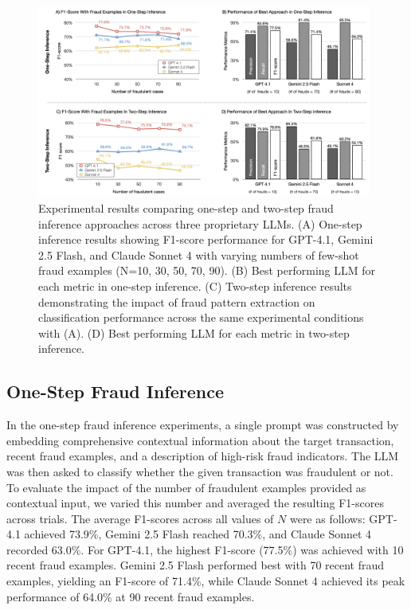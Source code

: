 \documentclass[sigconf]{acmart}
\begin{document}
\begin{figure}[t!]
  \centering
  \includegraphics[width=0.98\textwidth]{./figures/fig_results.png}
  \caption{Experimental results comparing one-step and two-step fraud inference approaches across three proprietary LLMs. (A) One-step inference results showing F1-score performance for GPT-4.1, Gemini 2.5 Flash, and Claude Sonnet 4 with varying numbers of few-shot fraud examples (N=10, 30, 50, 70, 90). (B) Best performing LLM for each metric in one-step inference. (C) Two-step inference results demonstrating the impact of fraud pattern extraction on classification performance across the same experimental conditions with (A). (D) Best performing LLM for each metric in two-step inference.}
  \label{fig_results}
\end{figure}




\subsection{One-Step Fraud Inference}
In the one-step fraud inference experiments, a single prompt was constructed by embedding comprehensive contextual information about the target transaction, recent fraud examples, and a description of high-risk fraud indicators. The LLM was then asked to classify whether the given transaction was fraudulent or not. To evaluate the impact of the number of fraudulent examples provided as contextual input, we varied this number and averaged the resulting F1-scores across trials.
The average F1-scores across all values of $N$ were as follows: GPT-4.1 achieved 73.9\%, Gemini 2.5 Flash reached 70.3\%, and Claude Sonnet 4 recorded 63.0\%.
For GPT-4.1, the highest F1-score (77.5\%) was achieved with 10 recent fraud examples.
 Gemini 2.5 Flash performed best with 70 recent fraud examples, yielding an F1-score of 71.4\%, while Claude Sonnet 4 achieved its peak performance of 64.0\% at 90 recent fraud examples.
\end{document}

